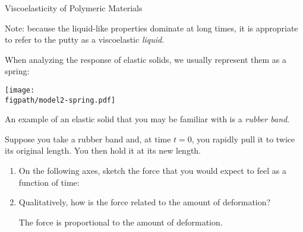 \begin{activity}{Viscoelasticity of Polymeric Materials}
\begin{ctqs}
\begin{solution}[2in]
				Note: because the liquid-like properties dominate at long times, it is appropriate to refer to the putty as a viscoelastic \emph{liquid}.
				
			\end{solution}
		
\end{ctqs}

\begin{model}

	When analyzing the response of elastic solids, we usually represent them as a spring:
	
	\vspace{3pt}
	\centerline{\texttt{[image: \\figpath/model2-spring.pdf]}}
	
	An example of an elastic solid that you may be familiar with is a \emph{rubber band}.
	
\end{model}

\begin{ctqs}
	\question Suppose you take a rubber band and, at time $t=0$, you rapidly pull it to twice its original length. You then hold it at its new length. \label{\labelbase:ctq:rubberbandstepstrain}
	
		\begin{enumerate}
			\item On the following axes, sketch the force that you would expect to feel as a function of time:
			
				\begin{solution}[1.5in]
				\end{solution}
			
			\item Qualitatively, how is the force related to the amount of deformation?
			
				\begin{solution}[1.2in]
					The force is proportional to the amount of deformation.
				\end{solution}
			

\end{enumerate}
\end{ctqs}
\end{activity}
